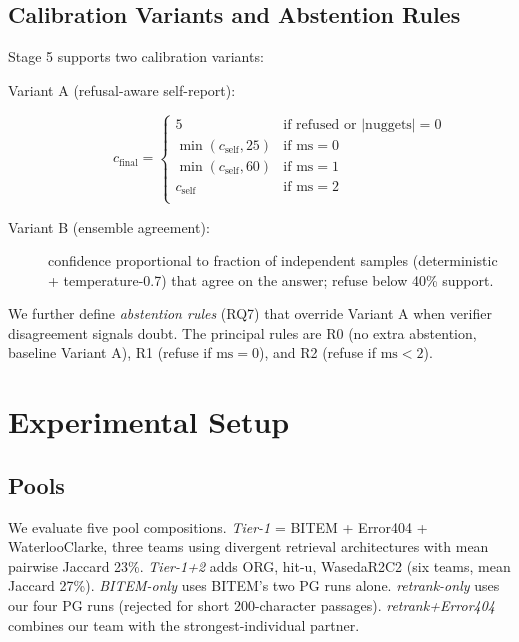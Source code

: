 \documentclass[11pt,a4paper]{article}
\begin{document}
\subsection{Calibration Variants and Abstention Rules}

Stage 5 supports two calibration variants:
\begin{description}
  \item[Variant A (refusal-aware self-report):]
    \[
      c_{\text{final}} = \begin{cases}
        5 & \text{if refused or } |\text{nuggets}|=0 \\
        \min(c_{\text{self}}, 25) & \text{if } \text{ms}=0 \\
        \min(c_{\text{self}}, 60) & \text{if } \text{ms}=1 \\
        c_{\text{self}} & \text{if } \text{ms}=2 \\
      \end{cases}
    \]
  \item[Variant B (ensemble agreement):] confidence proportional to
    fraction of independent samples (deterministic + temperature-0.7) that
    agree on the answer; refuse below 40\% support.
\end{description}

We further define \emph{abstention rules} (RQ7) that override Variant A
when verifier disagreement signals doubt. The principal rules are
\textsc{R0} (no extra abstention, baseline Variant A), \textsc{R1}
(refuse if $\text{ms}=0$), and \textsc{R2} (refuse if $\text{ms}<2$).

\section{Experimental Setup}\label{sec:setup}

\subsection{Pools}

We evaluate five pool compositions. \emph{Tier-1} = BITEM + Error404
+ WaterlooClarke, three teams using divergent retrieval architectures
with mean pairwise Jaccard 23\%. \emph{Tier-1+2} adds ORG, hit-u,
WasedaR2C2 (six teams, mean Jaccard 27\%). \emph{BITEM-only} uses
BITEM's two PG runs alone. \emph{retrank-only} uses our four PG runs
(rejected for short 200-character passages). \emph{retrank+Error404}
combines our team with the strongest-individual partner.
\end{document}
